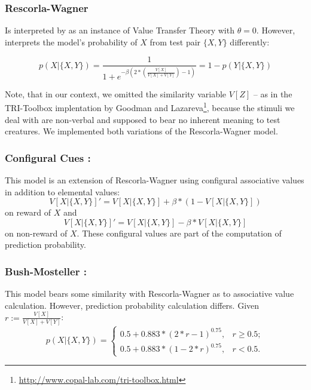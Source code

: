 \documentclass[10pt,letterpaper]{article}
\begin{document}
	\subsubsection{Rescorla-Wagner \cite{rescorla1972}} Is interpreted by  as an instance of Value Transfer Theory with $\theta = 0$. However,  interprets the model's probability of $X$ from test pair $\{X,Y\}$ differently:
	
	\begin{equation*}
	p(X|{ \{X, Y\}}) = \frac{1}{1+e^{-\beta \left(2*\left(\frac{V[X]}{V[X] + V[Y]}\right)-1\right)}} = 1- p(Y| {\{X, Y\}})
	\end{equation*}
	
	Note, that in our context, we omitted the similarity variable $V[Z]$ -- as in the TRI-Toolbox implentation by Goodman and  Lazareva\footnote{\url{http://www.copal-lab.com/tri-toolbox.html}}, because the stimuli we deal with are non-verbal and supposed to bear no inherent meaning to test creatures. We implemented both variations of the Rescorla-Wagner model. 
	
	\subsubsection{Configural Cues \cite{wynne1995}:} This model is an extension of Rescorla-Wagner using configural associative values in addition to elemental values:
	\begin{equation*}
	V[X|\{X,Y\}] '= V[X|\{X,Y\}] + \beta * (1 - V[X|\{X,Y\}])
	\end{equation*}
	on reward of $X$ and 
	\begin{equation*}
	V[X|\{X,Y\}] '= V[X|\{X,Y\}] - \beta  * V[X|\{X,Y\}]
	\end{equation*}
	on non-reward of $X$. These configural values are part of the computation of prediction probability.
	
	\subsubsection{Bush-Mosteller \cite{bush1955stochastic, wynne1995}:} This model  bears some similarity with Rescorla-Wagner as to associative value calculation. However, prediction probability calculation differs. Given $r := \frac{V[X]}{V[X] + V[Y]}$:
	\begin{equation*}
	p(X|{ \{X, Y\}}) = \begin{cases}
	0.5 + 0.883*\left(2*r - 1\right)^{0.75}
	, &r \geq 0.5;\\
	0.5 + 0.883*\left(1-2*r\right)^{0.75}
	, &r < 0.5.
	\end{cases}
	\end{equation*}
\end{document}
